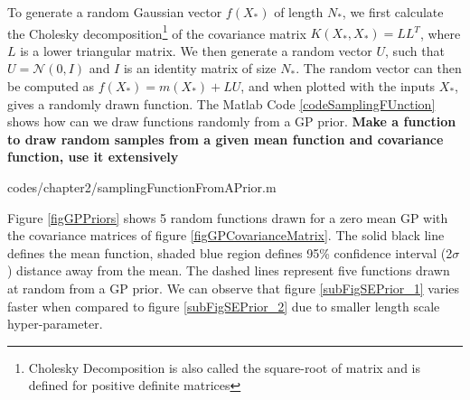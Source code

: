 To generate a random Gaussian vector $f(X_{*})$ of length $N_{*}$, we first calculate the Cholesky decomposition\footnote{Cholesky Decomposition is also called the square-root of matrix and is defined for positive definite matrices} of the covariance matrix $K(X_{*}, X_{*}) = LL^{T}$, where $L$ is a lower triangular matrix. We then generate a random vector $U$, such that $U = \mathcal{N}(0, I)$ and $I$ is an identity matrix of size $N_{*}$.  The random vector can then be computed as $f(X_{*}) = m(X_{*}) + LU$, and when plotted with the inputs $X_{*}$, gives a randomly drawn function. The Matlab Code \ref{codeSamplingFUnction} shows how can we draw functions randomly from a GP prior.
\textbf{Make a function to draw random samples from a given mean function and covariance function, use it extensively}
\begin{mdframed}[hidealllines=true,backgroundcolor=lightgray!20]

                    {codes/chapter2/samplingFunctionFromAPrior.m}
\end{mdframed}

Figure \ref{figGPPriors} shows 5 random functions drawn for a zero mean GP with the covariance matrices of figure \ref{figGPCovarianceMatrix}. The solid black line defines the mean function, shaded blue region defines 95\% confidence interval (2$\sigma$) distance away from the mean. The dashed lines represent five functions drawn at random from a GP prior. We can observe that figure \ref{subFigSEPrior_1} varies faster when compared to figure \ref{subFigSEPrior_2} due to smaller length scale hyper-parameter. 

